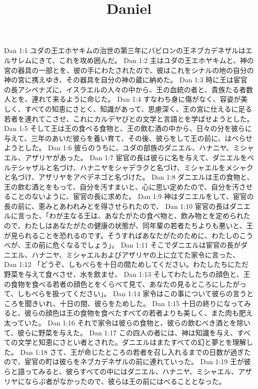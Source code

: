 

\title{Daniel}

Dan 1:1  ユダの王エホヤキムの治世の第三年にバビロンの王ネブカデネザルはエルサレムにきて、これを攻め囲んだ。
Dan 1:2  主はユダの王エホヤキムと、神の宮の器具の一部とを、彼の手にわたされたので、彼はこれをシナルの地の自分の神の宮に携えゆき、その器具を自分の神の蔵に納めた。
Dan 1:3  時に王は宦官の長アシペナズに、イスラエルの人々の中から、王の血統の者と、貴族たる者数人とを、連れて来るように命じた。
Dan 1:4  すなわち身に傷がなく、容姿が美しく、すべての知恵にさとく、知識があって、思慮深く、王の宮に仕えるに足る若者を連れてこさせ、これにカルデヤびとの文学と言語とを学ばせようとした。
Dan 1:5  そして王は王の食べる食物と、王の飲む酒の中から、日々の分を彼らに与えて、三年のあいだ彼らを養い育て、その後、彼らをして王の前に、はべらせようとした。
Dan 1:6  彼らのうちに、ユダの部族のダニエル、ハナニヤ、ミシャエル、アザリヤがあった。
Dan 1:7  宦官の長は彼らに名を与えて、ダニエルをベルテシャザルと名づけ、ハナニヤをシャデラクと名づけ、ミシャエルをメシャクと名づけ、アザリヤをアベデネゴと名づけた。
Dan 1:8  ダニエルは王の食物と、王の飲む酒とをもって、自分を汚すまいと、心に思い定めたので、自分を汚させることのないように、宦官の長に求めた。
Dan 1:9  神はダニエルをして、宦官の長の前に、恵みとあわれみとを得させられたので、
Dan 1:10  宦官の長はダニエルに言った、「わが主なる王は、あなたがたの食べ物と、飲み物とを定められたので、わたしはあなたがたの健康の状態が、同年輩の若者たちよりも悪いと、王が見られることを恐れるのです。そうすればあなたがたのために、わたしのこうべが、王の前に危くなるでしょう」。
Dan 1:11  そこでダニエルは宦官の長がダニエル、ハナニヤ、ミシャエルおよびアザリヤの上に立てた家令に言った、
Dan 1:12  「どうぞ、しもべらを十日の間ためしてください。わたしたちにただ野菜を与えて食べさせ、水を飲ませ、
Dan 1:13  そしてわたしたちの顔色と、王の食物を食べる若者の顔色とをくらべて見て、あなたの見るところにしたがって、しもべらを扱ってください」。
Dan 1:14  家令はこの事について彼らの言うところを聞きいれ、十日の間、彼らをためした。
Dan 1:15  十日の終りになってみると、彼らの顔色は王の食物を食べたすべての若者よりも美しく、また肉も肥え太っていた。
Dan 1:16  それで家令は彼らの食物と、彼らの飲むべき酒とを除いて、彼らに野菜を与えた。
Dan 1:17  この四人の者には、神は知識を与え、すべての文学と知恵にさとい者とされた。ダニエルはまたすべての幻と夢とを理解した。
Dan 1:18  さて、王が命じたところの若者を召し入れるまでの日数が過ぎたので、宦官の町は彼らをネブカデネザルの前に連れていった。
Dan 1:19  王が彼らと語ってみると、彼らすべての中にはダニエル、ハナニヤ、ミシャエル、アザリヤにならぶ者がなかったので、彼らは王の前にはべることとなった。
